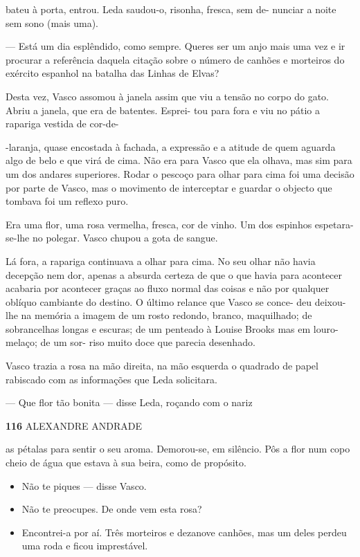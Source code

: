 bateu à porta, entrou. Leda saudou-o, risonha, fresca, sem de- nunciar a
noite sem sono (mais uma).

--- Está um dia esplêndido, como sempre. Queres ser um anjo mais uma vez
e ir procurar a referência daquela citação sobre o número de canhões e
morteiros do exército espanhol na batalha das Linhas de Elvas?

Desta vez, Vasco assomou à janela assim que viu a tensão no corpo do
gato. Abriu a janela, que era de batentes. Esprei- tou para fora e viu
no pátio a rapariga vestida de cor-de-

-laranja, quase encostada à fachada, a expressão e a atitude de quem
aguarda algo de belo e que virá de cima. Não era para Vasco que ela
olhava, mas sim para um dos andares superiores. Rodar o pescoço para
olhar para cima foi uma decisão por parte de Vasco, mas o movimento de
interceptar e guardar o objecto que tombava foi um reflexo puro.

Era uma flor, uma rosa vermelha, fresca, cor de vinho. Um dos espinhos
espetara-se-lhe no polegar. Vasco chupou a gota de sangue.

Lá fora, a rapariga continuava a olhar para cima. No seu olhar não havia
decepção nem dor, apenas a absurda certeza de que o que havia para
acontecer acabaria por acontecer graças ao fluxo normal das coisas e não
por qualquer oblíquo cambiante do destino. O último relance que Vasco se
conce- deu deixou-lhe na memória a imagem de um rosto redondo, branco,
maquilhado; de sobrancelhas longas e escuras; de um penteado à Louise
Brooks mas em louro-melaço; de um sor- riso muito doce que parecia
desenhado.

Vasco trazia a rosa na mão direita, na mão esquerda o quadrado de papel
rabiscado com as informações que Leda solicitara.

--- Que flor tão bonita --- disse Leda, roçando com o nariz

\textbf{116 }ALEXANDRE ANDRADE

as pétalas para sentir o seu aroma. Demorou-se, em silêncio. Pôs a flor
num copo cheio de água que estava à sua beira, como de propósito.

\begin{itemize}
\tightlist
\item
  Não te piques --- disse Vasco.
\item
  Não te preocupes. De onde vem esta rosa?
\item
  Encontrei-a por aí. Três morteiros e dezanove canhões, mas um deles
  perdeu uma roda e ficou imprestável.
\end{itemize}

